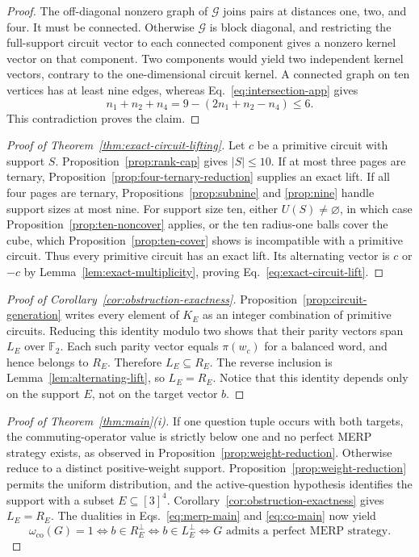 \documentclass[11pt]{article}
\theoremstyle{definition}
\theoremstyle{remark}
\newcommand{\F}{\mathbb{F}}
\newcommand{\co}{\mathrm{co}}
\newcommand{\card}[1]{\lvert #1\rvert}
\numberwithin{equation}{section}
\begin{document}
\begin{proof}
The off-diagonal nonzero graph of \(\mathcal G\) joins pairs at distances one,
two, and four.  It must be connected.  Otherwise \(\mathcal G\) is block
diagonal, and
restricting the full-support circuit vector to each connected component gives
a nonzero kernel vector on that component.  Two components would yield two
independent kernel vectors, contrary to the one-dimensional circuit kernel.
A connected graph on ten vertices has at least nine edges, whereas
Eq.~\eqref{eq:intersection-app} gives
\[
  n_1+n_2+n_4
  =
  9-(2n_1+n_2-n_4)
  \leq6.
\]
This contradiction proves the claim.
\end{proof}

\begin{proof}[Proof of Theorem~\ref{thm:exact-circuit-lifting}]
Let \(c\) be a primitive circuit with support \(S\).
Proposition~\ref{prop:rank-cap} gives \(\card S\leq10\).  If at most three pages are ternary,
Proposition~\ref{prop:four-ternary-reduction} supplies an exact lift.  If all
four pages are ternary, Propositions~\ref{prop:subnine} and \ref{prop:nine}
handle support sizes at most nine.  For support size ten, either
\(U(S)\neq\varnothing\), in which case
Proposition~\ref{prop:ten-noncover} applies, or the ten radius-one balls cover
the cube, which Proposition~\ref{prop:ten-cover} shows is incompatible with a
primitive circuit.  Thus every primitive circuit has an exact lift.  Its
alternating vector is \(c\) or \(-c\) by
Lemma~\ref{lem:exact-multiplicity}, proving
Eq.~\eqref{eq:exact-circuit-lift}.
\end{proof}

\begin{proof}[Proof of Corollary~\ref{cor:obstruction-exactness}]
Proposition~\ref{prop:circuit-generation} writes every element of \(K_E\) as
an integer combination of primitive circuits.  Reducing this identity modulo
two shows that their parity vectors span \(L_E\) over \(\F_2\).  Each such
parity vector equals \(\pi(w_c)\) for a balanced word, and hence belongs to
\(R_E\).  Therefore \(L_E\subseteq R_E\).  The reverse inclusion is
Lemma~\ref{lem:alternating-lift}, so \(L_E=R_E\).  Notice that this identity
depends only on the support \(E\), not on the target vector \(b\).
\end{proof}

\begin{proof}[Proof of Theorem~\ref{thm:main}(i)]
If one question tuple occurs with both targets, the commuting-operator value
is strictly below one and no perfect MERP strategy exists, as observed in
Proposition~\ref{prop:weight-reduction}.  Otherwise reduce to a distinct
positive-weight support.  Proposition~\ref{prop:weight-reduction} permits the
uniform distribution, and the active-question hypothesis identifies the
support with a subset \(E\subseteq[3]^4\).
Corollary~\ref{cor:obstruction-exactness} gives \(L_E=R_E\).  The dualities in
Eqs.~\eqref{eq:merp-main} and
\eqref{eq:co-main} now yield
\[
  \omega_{\co}(G)=1
  \Longleftrightarrow b\in R_E^\perp
  \Longleftrightarrow b\in L_E^\perp
  \Longleftrightarrow G\text{ admits a perfect MERP strategy}.
\]
\end{proof}
\end{document}
